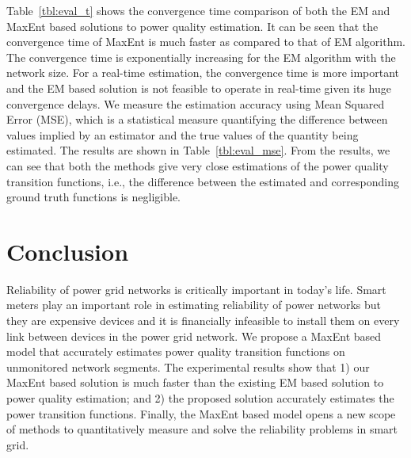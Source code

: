 Table~\ref{tbl:eval_t} shows the convergence time comparison of both the EM and MaxEnt based solutions to power quality estimation. It can be seen that the convergence time of MaxEnt is much faster as compared to that of EM algorithm. The convergence time is exponentially increasing for the EM algorithm with the network size. For a real-time estimation, the convergence time is more important and the EM based solution is not feasible to operate in real-time given its huge convergence delays. We measure the estimation accuracy using Mean Squared Error (MSE), which is a statistical measure quantifying the difference between values implied by an estimator and the true values of the quantity being estimated. The results are shown in Table~\ref{tbl:eval_mse}. From the results, we can see that both the methods give very close estimations of the power quality transition functions, i.e., the difference between the estimated and corresponding ground truth functions is negligible.


\section{Conclusion}
Reliability of power grid networks is critically important in today's life.  Smart meters play an important role in estimating reliability of power networks but they are expensive devices and it is financially infeasible to install them on every link between devices in the power grid network. We propose a MaxEnt based model that accurately estimates power quality transition functions on unmonitored network segments. The experimental results show that 1) our MaxEnt based solution is much faster than the existing EM based solution to power quality estimation; and 2) the proposed solution accurately estimates the power transition functions. Finally, the MaxEnt based model opens a new scope of methods to quantitatively measure and solve the reliability problems in smart grid.